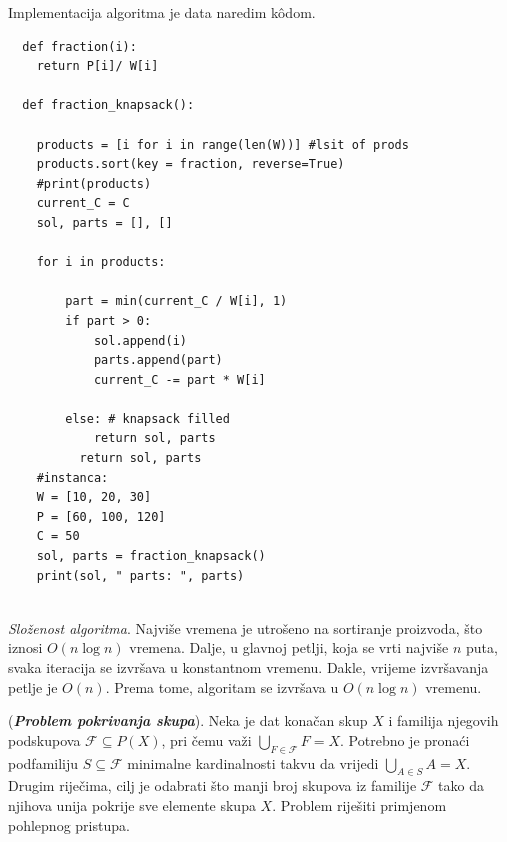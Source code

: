   Implementacija algoritma je data naredim k\^odom. 
   
   \begin{verbatim}
  def fraction(i):
  	return P[i]/ W[i]
  
  def fraction_knapsack():
  
  	products = [i for i in range(len(W))] #lsit of prods
  	products.sort(key = fraction, reverse=True)
  	#print(products)
  	current_C = C
  	sol, parts = [], []

  	for i in products:
  
  		part = min(current_C / W[i], 1)
  		if part > 0:
  			sol.append(i)
  			parts.append(part)
  			current_C -= part * W[i]
  
  		else: # knapsack filled
  			return sol, parts
          return sol, parts
    #instanca: 
    W = [10, 20, 30]
    P = [60, 100, 120]
    C = 50
    sol, parts = fraction_knapsack()
    print(sol, " parts: ", parts)
  
   \end{verbatim}

\textit{Složenost algoritma}.  Najviše vremena je utrošeno na sortiranje proi\-zvoda, što iznosi $O(n \log n)$ vremena. Dalje, u glavnoj petlji, koja se vrti najviše $n$ puta,  svaka iteracija se izvršava u konstantnom vremenu. Dakle, vrijeme izvršavanja petlje je $O(n)$. Prema tome, algoritam se izvršava u $O(n \log n)$ vremenu. %



\begin{example}
	(\textbf{\emph{Problem pokrivanja skupa}}). 	Neka je dat konačan skup $X$ i familija njegovih podskupova
	$\mathcal{F}\subseteq P(X)$, pri čemu važi 	$\bigcup_{F\in \mathcal{F}} F = X.$ Potrebno je pronaći podfamiliju $S\subseteq \mathcal{F}$ minimalne kardinalnosti takvu da vrijedi $\bigcup_{A\in S} A = X.$ \\
	
	Drugim riječima, cilj je odabrati što manji broj skupova iz familije $\mathcal{F}$ tako da njihova unija pokrije sve elemente skupa $X$. Problem riješiti primjenom pohlepnog pristupa.
\end{example}

